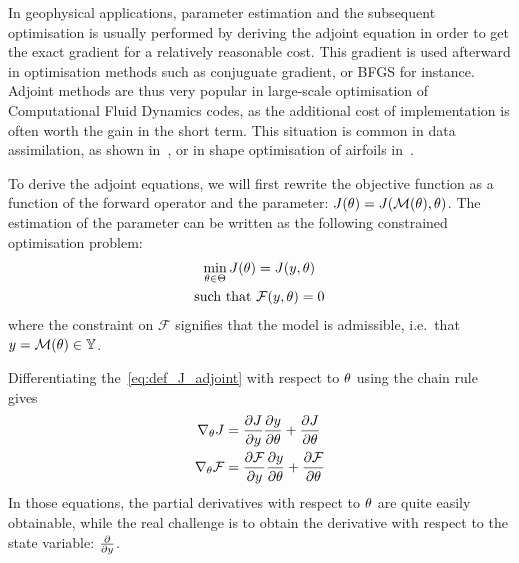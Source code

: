 \documentclass[../../Main_ManuscritThese.tex]{subfiles}
\begin{document}
In geophysical applications, parameter estimation and the subsequent
optimisation is usually performed by deriving the adjoint equation in
order to get the exact gradient for a relatively reasonable cost. This
gradient is used afterward in optimisation methods such as conjuguate
gradient, or BFGS for instance. Adjoint methods are thus very popular
in large-scale optimisation of Computational Fluid Dynamics codes, as
the additional cost of implementation is often worth the gain in the
short term. This situation is common in data assimilation, as shown
in~\cite{das_estimation_1991,das_variational_1992,honnorat_identification_2010,couderc_dassfow-shallow_2013},
or in shape optimisation of airfoils in~\cite{huyse_free-form_2001}.

To derive the adjoint equations, we will first rewrite the objective function as a function of the forward operator and the parameter: $J(\theta) = J(\mathcal{M}(\theta),\theta)$.
The estimation of the parameter can be written as the following constrained optimisation problem:
\begin{equation}
  \begin{aligned}
  \min_{\kk \in \Kspace} J(\kk) &= J(y, \kk) \label{eq:def_J_adjoint} \\
  \text{such that } &\mathcal{F}(y, \kk) = 0 %
  \end{aligned}
\end{equation}
where the constraint on $\mathcal{F}$ signifies that the model is admissible, i.e.\ that $y = \mathcal{M}(\theta)\in \mathbb{Y}$.

 Differentiating the~\cref{eq:def_J_adjoint} with respect to $\theta$ using the chain rule gives
\begin{equation}
  \begin{aligned}
  \nabla_\theta J &= \frac{\partial J}{\partial y} \frac{\partial y}{\partial \theta} + \frac{\partial J}{\partial \theta}\\
    \nabla_\theta \mathcal{F} &= \frac{\partial \mathcal{F}}{\partial y} \frac{\partial y}{\partial \theta} + \frac{\partial \mathcal{F}}{\partial \theta}
  \end{aligned} \label{eq:aze}
\end{equation}
In those equations, the partial derivatives with respect to $\theta$ are quite easily obtainable, while the real challenge is to obtain the derivative with respect to the state variable: $\frac{\partial }{\partial y}$.
\end{document}
